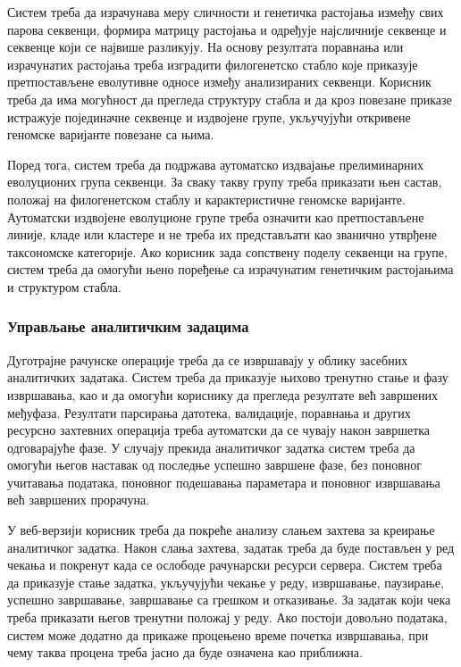 \documentclass[12pt,oneside]{memoir}
\begin{document}
Систем треба да израчунава меру сличности и генетичка растојања између свих парова секвенци, формира матрицу растојања и одређује најсличније секвенце и секвенце који се највише разликују. На основу резултата поравнања или израчунатих растојања треба изградити филогенетско стабло које приказује претпостављене еволутивне односе између анализираних секвенци. Корисник треба да има могућност да прегледа структуру стабла и да кроз повезане приказе истражује појединачне секвенце и издвојене групе, укључујући откривене геномске варијанте повезане са њима.

Поред тога, систем треба да подржава аутоматско издвајање прелиминарних еволуционих група секвенци. За сваку такву групу треба приказати њен састав, положај на филогенетском стаблу и карактеристичне геномске варијанте. Аутоматски издвојене еволуционе групе треба означити као претпостављене линије, кладе или кластере и не треба их представљати као званично утврђене таксономске категорије. Ако корисник зада сопствену поделу секвенци на групе, систем треба да омогући њено поређење са израчунатим генетичким растојањима и структуром стабла.


\subsubsection{Управљање аналитичким задацима}
Дуготрајне рачунске операције треба да се извршавају у облику засебних аналитичких задатака. Систем треба да приказује њихово тренутно стање и фазу извршавања, као и да омогући кориснику да прегледа резултате већ завршених међуфаза. Резултати парсирања датотека, валидације, поравнања и других ресурсно захтевних операција треба аутоматски да се чувају након завршетка одговарајуће фазе. У случају прекида аналитичког задатка систем треба да омогући његов наставак од последње успешно завршене фазе, без поновног учитавања података, поновног подешавања параметара и поновног извршавања већ завршених прорачуна.

У веб-верзији корисник треба да покреће анализу слањем захтева за креирање аналитичког задатка. Након слања захтева, задатак треба да буде постављен у ред чекања и покренут када се ослободе рачунарски ресурси сервера. Систем треба да приказује стање задатка, укључујући чекање у реду, извршавање, паузирање, успешно завршавање, завршавање са грешком и отказивање. За задатак који чека треба приказати његов тренутни положај у реду. Ако постоји довољно података, систем може додатно да прикаже процењено време почетка извршавања, при чему таква процена треба јасно да буде означена као приближна.
\end{document}
